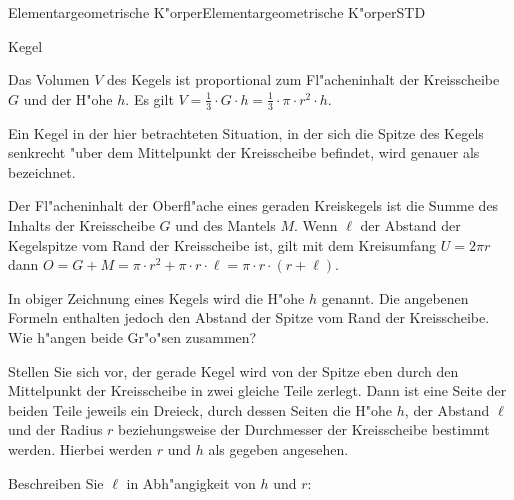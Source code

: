 \begin{MXContent}{Elementargeometrische K"orper}{Elementargeometrische K"orper}{STD}
\begin{MXInfo}{Kegel}
\begin{center}
{
}
\end{center}

Das Volumen $V$ des Kegels ist proportional zum Fl"acheninhalt der 
Kreisscheibe $G$ und der H"ohe $h$. 
Es gilt $V = \frac{1}{3} \cdot G \cdot h %
 = \frac{1}{3} \cdot \pi \cdot r^2 \cdot h$.

Ein Kegel in der hier betrachteten Situation, in der sich die Spitze des 
Kegels senkrecht "uber dem Mittelpunkt der Kreisscheibe befindet, wird 
genauer als  bezeichnet.

Der Fl"acheninhalt der Oberfl"ache eines geraden Kreiskegels ist die Summe 
des Inhalts der Kreisscheibe $G$ und des Mantels $M$. Wenn $\ell$ der Abstand 
der Kegelspitze vom Rand der Kreisscheibe ist, 
gilt mit dem Kreisumfang $U =  2 \pi r$ dann
$O = G + M = \pi \cdot r^2 + \pi \cdot r \cdot \ell %
 = \pi \cdot r \cdot (r + \ell)$.
\end{MXInfo}

In obiger Zeichnung eines Kegels wird die H"ohe $h$ genannt. Die angebenen 
Formeln enthalten jedoch den Abstand der Spitze vom Rand der Kreisscheibe.
Wie h"angen beide Gr"o"sen zusammen?

\begin{MExercise}
Stellen Sie sich vor, der gerade Kegel wird von der Spitze eben 
durch den Mittelpunkt der Kreisscheibe in zwei gleiche Teile zerlegt.
Dann ist eine Seite der beiden Teile jeweils ein Dreieck, durch dessen Seiten 
die H"ohe $h$, der Abstand $\ell$ und der Radius $r$ beziehungsweise der 
Durchmesser der Kreisscheibe bestimmt werden.
Hierbei werden $r$ und $h$ als gegeben angesehen.

\begin{MExerciseItems}
\item
Beschreiben Sie $\ell$ in Abh"angigkeit von $h$ und $r$:
\par
{}


\end{MExerciseItems}
\end{MExercise}
\end{MXContent}
